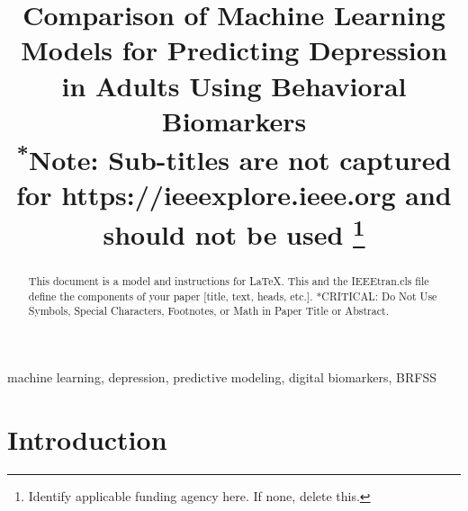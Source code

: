 \documentclass[conference]{IEEEtran}
\begin{document}
\title{Comparison of Machine Learning Models for Predicting Depression in Adults Using Behavioral Biomarkers\\
{\footnotesize \textsuperscript{*}Note: Sub-titles are not captured for https://ieeexplore.ieee.org  and
should not be used}
\thanks{Identify applicable funding agency here. If none, delete this.}
}
\author{
\and
{}
\and
{}
}

\maketitle

\begin{abstract}
This document is a model and instructions for \LaTeX.
This and the IEEEtran.cls file define the components of your paper [title, text, heads, etc.]. *CRITICAL: Do Not Use Symbols, Special Characters, Footnotes, 
or Math in Paper Title or Abstract.
\end{abstract}

\begin{IEEEkeywords}
machine learning, depression, predictive modeling, digital biomarkers, BRFSS
\end{IEEEkeywords}

\section{Introduction}
\end{document}
